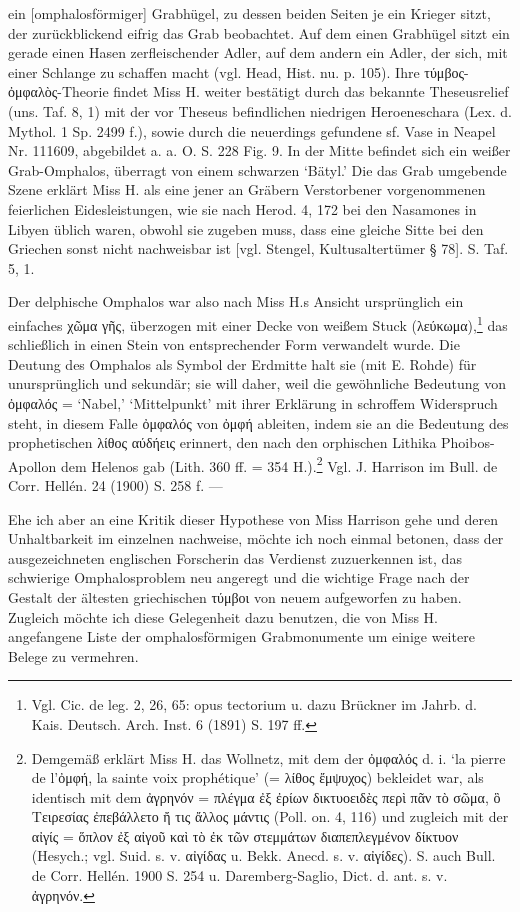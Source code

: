 \documentclass[a4paper, 11pt, oneside]{article}
\begin{document}
ein [omphalosförmiger] Grabhügel, zu dessen beiden Seiten je ein Krieger sitzt, der zurückblickend eifrig das Grab beobachtet. Auf dem einen Grabhügel sitzt ein gerade einen Hasen zerfleischender Adler, auf dem andern ein Adler, der sich, mit einer Schlange zu schaffen macht (vgl. Head, Hist. nu. p. 105). Ihre τύμβος-ὀμφαλὸς-Theorie findet Miss H. weiter bestätigt durch das bekannte Theseusrelief (uns. Taf. 8, 1) mit der vor Theseus befindlichen niedrigen Heroeneschara (Lex. d. Mythol. 1 Sp. 2499 f.), sowie durch die neuerdings gefundene sf. Vase in Neapel Nr. 111609, abgebildet a. a. O. S. 228 Fig. 9. In der Mitte befindet sich ein weißer Grab-Omphalos, überragt von einem schwarzen `Bätyl.' Die das Grab umgebende Szene erklärt Miss H. als eine jener an Gräbern Verstorbener vorgenommenen feierlichen Eidesleistungen, wie sie nach Herod. 4, 172 bei den Nasamones in Libyen üblich waren, obwohl sie zugeben muss, dass eine gleiche Sitte bei den Griechen sonst nicht nachweisbar ist [vgl. Stengel, Kultusaltertümer § 78]. S. Taf. 5, 1.

Der delphische Omphalos war also nach Miss H.s Ansicht ursprünglich ein einfaches χῶμα γῆς, überzogen mit einer Decke von weißem Stuck (λεύκωμα),\footnote{Vgl. Cic. de leg. 2, 26, 65: opus tectorium u. dazu Brückner im Jahrb. d. Kais. Deutsch. Arch. Inst. 6 (1891) S. 197 ff.} das schließlich in einen Stein von entsprechender Form verwandelt wurde. Die Deutung des Omphalos als Symbol der Erdmitte halt sie (mit E. Rohde) für unursprünglich und sekundär; sie will daher, weil die gewöhnliche Bedeutung von ὀμφαλός = `Nabel,' `Mittelpunkt' mit ihrer Erklärung in schroffem Widerspruch steht, in diesem Falle ὀμφαλός von ὀμφή ableiten, indem sie an die Bedeutung des prophetischen λίθος αύδήεις erinnert, den nach den orphischen Lithika Phoibos-Apollon dem Helenos gab (Lith. 360 ff. = 354 H.).\footnote{Demgemäß erklärt Miss H. das Wollnetz, mit dem der ὀμφαλός d. i. `la pierre de l'ὀμφή, la sainte voix prophétique' (= λίθος ἔμψυχος) bekleidet war, als identisch mit dem ἀγρηνόν = πλέγμα ἐξ ἐρίων δικτυοειδὲς περὶ πᾶν τὸ σῶμα, ὃ Τειρεσίας ἐπεβάλλετο ἤ τις ἄλλος μάντις (Poll. on. 4, 116) und zugleich mit der αἰγίς = ὅπλον ἐξ αἰγοῦ καὶ τὸ ἐκ τῶν στεμμάτων διαπεπλεγμένον δίκτυον (Hesych.; vgl. Suid. s. v. αἰγίδας u. Bekk. Anecd. s. v. αἰγίδες). S. auch Bull. de Corr. Hellén. 1900 S. 254 u. Daremberg-Saglio, Dict. d. ant. s. v. ἀγρηνόν.} Vgl. J. Harrison im Bull. de Corr. Hellén. 24 (1900) S. 258 f. ---

Ehe ich aber an eine Kritik dieser Hypothese von Miss Harrison gehe und deren Unhaltbarkeit im einzelnen nachweise, möchte ich noch einmal betonen, dass der ausgezeichneten englischen Forscherin das Verdienst zuzuerkennen ist, das schwierige Omphalosproblem neu angeregt und die wichtige Frage nach der Gestalt der ältesten griechischen τύμβοι von neuem aufgeworfen zu haben. Zugleich möchte ich diese Gelegenheit dazu benutzen, die von Miss H. angefangene Liste der omphalosförmigen Grabmonumente um einige weitere Belege zu vermehren.
\end{document}
